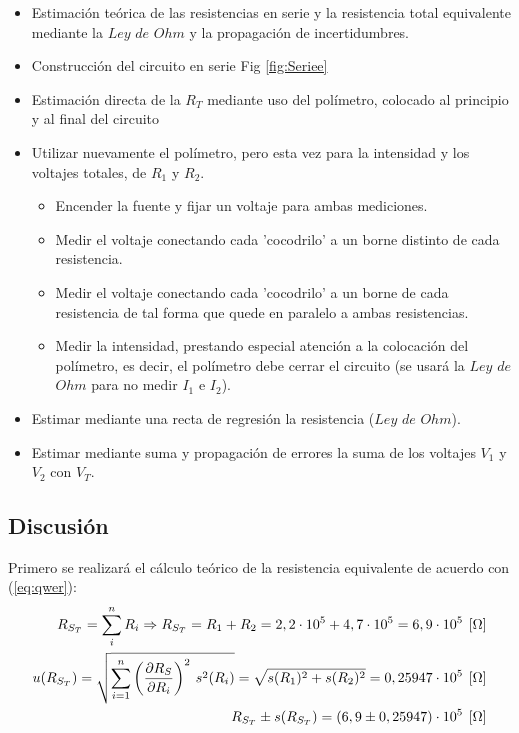 \documentclass[11pt]{report}
\begin{document}
\begin{refsection}
\begin{itemize}
    \item Estimación teórica de las resistencias en serie y la resistencia total equivalente mediante
    la $Ley$ $de$ $Ohm$ y la propagación de incertidumbres.
    \item Construcción del circuito en serie Fig \ref{fig:Seriee}
    \item Estimación directa de la $R_T$ mediante uso del polímetro, colocado al principio y al final del circuito 
    \item Utilizar nuevamente el polímetro, pero esta vez para la intensidad y los voltajes totales, de $R_1$ y $R_2$.
    \begin{itemize}
        \item Encender la fuente y fijar un voltaje para ambas mediciones.
        \item Medir el voltaje conectando cada 'cocodrilo' a un borne distinto de cada resistencia.
        \item Medir el voltaje conectando cada 'cocodrilo' a un borne de cada resistencia de tal forma que quede en paralelo a ambas resistencias.
        \item Medir la intensidad, prestando especial atención a la colocación del polímetro, 
        es decir, el polímetro debe cerrar el circuito (se usará la $Ley$ $de$ $Ohm$ para no medir $I_1$ e $I_2$).
    \end{itemize}
    \item Estimar mediante una recta de regresión la resistencia ($Ley$ $de$ $Ohm$).
    \item Estimar mediante suma y propagación de errores la suma de los voltajes $V_1$ y $V_2$ con $V_T$.
\end{itemize}

\subsection{Discusión}

Primero se realizará el cálculo teórico de la resistencia equivalente de acuerdo con (\ref{eq:qwer}):
\begin{equation}
\begin{split}
    R_{S_T}=\sum^n_i R_i  \Rightarrow R_{S_T} = R_1 + R_2 = 2,2 \cdot 10^5 + 4,7 \cdot 10^5 = 6,9 \cdot 10^5 \hspace{4pt}[\Omega] \\
    u(R_{S_T})=\sqrt{\sum^n_{i=1} \left( \frac{\partial R_S}{\partial R_i} \right)^2\hspace{2 pt} s^2(R_i)}=\sqrt{s(R_1)^2+s(R_2)^2}
    =0,25947 \cdot 10^5 \hspace{4pt}[\Omega] \\
    R_{S_T} \pm s(R_{S_T})=(6,9 \pm 0,25947)\cdot 10^5 \hspace{4pt}[\Omega]
    \label{eq:qwer}
\end{split}
\end{equation}


\end{refsection}
\end{document}
